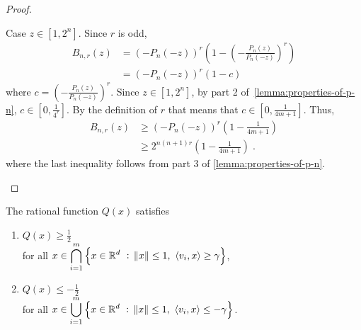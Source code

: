\begin{proof}
\begin{enumerate}
Case $z \in [1,2^n]$. Since $r$ is odd,
\begin{align*}
B_{n,r}(z)
& = \left(- P_{n}(-z)\right)^r \left(1 - \left( - \frac{P_n(z)}{P_n(-z)}\right)^r \right) \\
& = \left(- P_{n}(-z)\right)^r (1 - c)
\end{align*}
where $c = \left( - \frac{P_n(z)}{P_n(-z)}\right)^r$. Since $z \in [1,2^n]$, by
part 2 of~\autoref{lemma:properties-of-p-n}, $c \in [0,\frac{1}{4^r}]$. By
the definition of $r$ that means that $c \in [0,\frac{1}{4m+1}]$. Thus,
\begin{align*}
B_{n,r}(z)
& \ge \left(- P_{n}(-z)\right)^r \left( 1 - \frac{1}{4m+1} \right) \\
& \ge 2^{n(n+1)r} \left( 1 - \frac{1}{4m+1} \right) \; .
\end{align*}
where the last inequality follows from part 3 of \autoref{lemma:properties-of-p-n}.
\end{enumerate}
\end{proof}

\begin{lemma}[Properties of $Q(x)$]
\label{lemma:properties-of-q}
The rational function $Q(x)$ satisfies
\begin{enumerate}
\item $Q(x) \ge \frac{1}{2}$ \\ for all $\displaystyle x \in \bigcap_{i=1}^m \left\{ x \in \mathbb{R}^d ~:~ \norm{x} \le 1, \ \left\langle v_i, x \right\rangle \ge \gamma \right\}$,
\item $Q(x) \le -\frac{1}{2}$ \\ for all $\displaystyle x \in \bigcup_{i=1}^m \left\{ x \in \mathbb{R}^d ~:~ \norm{x} \le 1, \ \left\langle v_i, x \right\rangle \le - \gamma \right\}$.
\end{enumerate}
\end{lemma}

